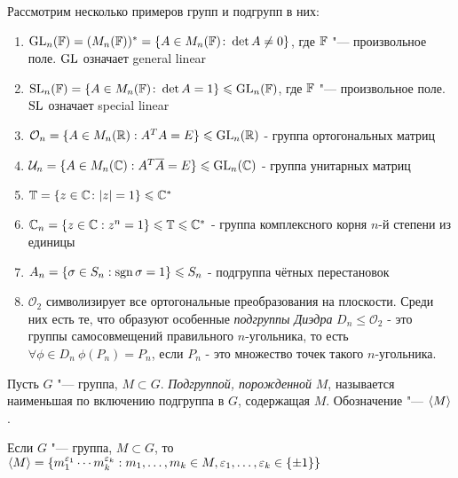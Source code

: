 \begin{example}
	Рассмотрим несколько примеров групп и подгрупп в них:
	\begin{enumerate}
		\item $\operatorname{GL}_n(\mathbb{F}) = (M_n(\mathbb{F}))^* = \{A \in M_n(\mathbb{F}) \colon \det{A} \ne 0\}$, где $\mathbb{F}$ "--- произвольное поле. $\operatorname{GL}$ означает general linear
		
		\item $\operatorname{SL}_n(\mathbb{F}) = \{A \in M_n(\mathbb{F}) \colon \det A = 1\} \leqslant \operatorname{GL}_n(\mathbb{F})$, где $\mathbb{F}$ "--- произвольное поле. $\operatorname{SL}$ означает special linear
		
		\item $\mathcal{O}_n = \{A \in M_n(\mathbb{R}): A^TA = E\} \leqslant \operatorname{GL}_n(\mathbb{R})$ - группа ортогональных матриц
		
		\item $\mathcal{U}_n = \{A \in M_n(\mathbb{C}): A^T\overline{A} = E\} \leqslant \operatorname{GL}_n(\mathbb{C})$ - группа унитарных матриц
		
		\item $\mathbb{T} = \{z \in \mathbb{C} \colon |z| = 1\} \leqslant \mathbb{C}^*$
		
		\item $\mathbb{C}_n = \{z \in \mathbb{C}: z^n = 1\} \leqslant \mathbb{T} \leqslant \mathbb{C}^*$ - группа комплексного корня $n$-й степени из единицы
		
		\item $A_n = \{\sigma \in S_n: \operatorname{\mathop{sgn}}\sigma = 1\} \leqslant S_n$ - подгруппа чётных перестановок
		
		\item $\mathcal{O}_2$ символизирует все ортогональные преобразования на плоскости. Среди них есть те, что образуют особенные \textit{подгруппы Диэдра} $D_n \le \mathcal{O}_2$ - это группы самосовмещений правильного $n$-угольника, то есть $\forall \phi \in D_n\ \phi(P_n) = P_n$, если $P_n$ - это множество точек такого $n$-угольника.
	\end{enumerate}
\end{example}

\begin{definition}
	Пусть $G$ "--- группа, $M \subset G$. \textit{Подгруппой, порожденной} $M$, называется наименьшая по включению подгруппа в $G$, содержащая $M$. Обозначение "--- $\langle M\rangle$.
\end{definition}

\begin{reminder}
	Если $G$ "--- группа, $M \subset G$, то $\langle M\rangle = \{m_1^{\epsilon_1}\dotsm m_k^{\epsilon_k}: m_1, \dotsc, m_k \hm\in M, \epsilon_1, \dotsc, \epsilon_k \in \{\pm1\}\}$
\end{reminder}

